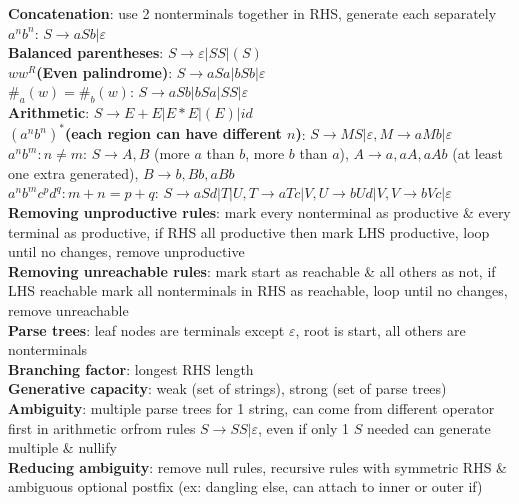 \documentclass[a4paper]{article}
\begin{document}
\begin{multicols}{2}
        \textbf{Concatenation}: use 2 nonterminals together in RHS, generate each separately\\
        \boldmath$a^n b^n$\unboldmath: $S \to aSb | \varepsilon$\\
        \textbf{Balanced parentheses}: $S \to \varepsilon | SS | (S)$\\
        \boldmath$w w^R$\unboldmath\textbf{(Even palindrome)}: $S \to aSa | bSb | \varepsilon$\\
        \boldmath$\#_a (w) = \#_b (w)$\unboldmath: $S \to aSb | bSa | SS | \varepsilon$\\
        \textbf{Arithmetic}: $S \to E + E | E * E | (E) | id$\\
        \boldmath${(a^n b^n)}^*$\textbf{(each region can have different $n$)}\unboldmath: $S \to MS | \varepsilon, M \to aMb | \varepsilon$\\
        \boldmath$a^n b^m: n \neq m$\unboldmath: $S \to A,B$ (more $a$ than $b$, more $b$ than $a$), $A \to a, aA, aAb$ (at least one extra generated), $B \to b, Bb, aBb$\\
        \boldmath$a^n b^m c^p d^q : m+n = p+q$\unboldmath: $S \to aSd | T | U, T \to aTc | V, U \to bUd | V, V \to bVc | \varepsilon$\\
        \textbf{Removing unproductive rules}: mark every nonterminal as productive \& every terminal as productive, if RHS all productive then mark LHS productive, loop until no changes, remove unproductive\\
        \textbf{Removing unreachable rules}: mark start as reachable \& all others as not, if LHS reachable mark all nonterminals in RHS as reachable, loop until no changes, remove unreachable\\
        \textbf{Parse trees}: leaf nodes are terminals except $\varepsilon$, root is start, all others are nonterminals\\
        \textbf{Branching factor}: longest RHS length\\
        \textbf{Generative capacity}: weak (set of strings), strong (set of parse trees)\\
        \textbf{Ambiguity}: multiple parse trees for 1 string, can come from different operator first in arithmetic orfrom rules $S \to SS | \varepsilon$, even if only 1 $S$ needed can generate multiple \& nullify\\
        \textbf{Reducing ambiguity}: remove null rules, recursive rules with symmetric RHS \& ambiguous optional postfix (ex: dangling else, can attach to inner or outer if)\\

\end{multicols}
\end{document}
